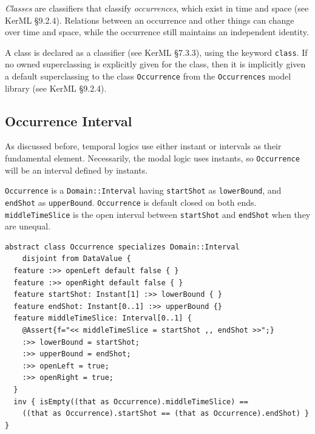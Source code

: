 

\pn \emph{Classes} are classifiers that classify \emph{occurrences}, which exist in time and space (see KerML \S9.2.4). Relations between an occurrence and other things can change over time and space, while the occurrence still maintains an independent identity.

\pn A class is declared as a classifier (see KerML \S7.3.3), using the keyword \lstinline{class}. If no owned superclassing is explicitly given for the class, then it is implicitly given a default superclassing to the class \texttt{Occurrence} from the \texttt{Occurrences} model library (see KerML \S9.2.4).

%

\subsection{Occurrence Interval}
\pn As discussed before, temporal logics use either instant or intervals as their fundamental element.
Necessarily, the modal logic uses instants, so \texttt{Occurrence} will be an interval defined by instants.

\pn  \texttt{Occurrence} is a \texttt{Domain::Interval} having \texttt{startShot} as  \texttt{lowerBound}, and  \texttt{endShot} as  \texttt{upperBound}.
\texttt{Occurrence} is default closed on both ends.
  \texttt{middleTimeSlice} is the open interval between \texttt{startShot} and \texttt{endShot} when they are unequal.

\begin{lstlisting}
abstract class Occurrence specializes Domain::Interval
    disjoint from DataValue {
  feature :>> openLeft default false { }
  feature :>> openRight default false { }
  feature startShot: Instant[1] :>> lowerBound { }
  feature endShot: Instant[0..1] :>> upperBound {}
  feature middleTimeSlice: Interval[0..1] {
    @Assert{f="<< middleTimeSlice = startShot ,, endShot >>";}
    :>> lowerBound = startShot;
    :>> upperBound = endShot;
    :>> openLeft = true;
    :>> openRight = true;
  }
  inv { isEmpty((that as Occurrence).middleTimeSlice) ==
    ((that as Occurrence).startShot == (that as Occurrence).endShot) }
}
\end{lstlisting}

